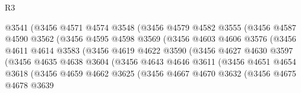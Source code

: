 \begin{lexlean}{R3}
\begin{coremodule}
                          @3541
                          (@3456
                            @4571
                            @4574
                            @3548
                            (@3456
                              @4579
                              @4582
                              @3555
                              (@3456
                                @4587
                                @4590
                                @3562
                                (@3456
                                  @4595
                                  @4598
                                  @3569
                                  (@3456
                                    @4603
                                    @4606
                                    @3576
                                    (@3456
                                      @4611
                                      @4614
                                      @3583
                                      (@3456
                                        @4619
                                        @4622
                                        @3590
                                        (@3456
                                          @4627
                                          @4630
                                          @3597
                                          (@3456
                                            @4635
                                            @4638
                                            @3604
                                            (@3456
                                              @4643
                                              @4646
                                              @3611
                                              (@3456
                                                @4651
                                                @4654
                                                @3618
                                                (@3456
                                                  @4659
                                                  @4662
                                                  @3625
                                                  (@3456
                                                    @4667
                                                    @4670
                                                    @3632
                                                    (@3456
                                                      @4675
                                                      @4678
                                                      @3639

\end{coremodule}
\end{lexlean}
